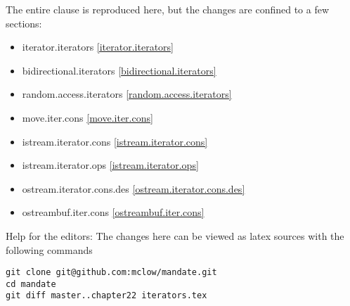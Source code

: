The entire clause is reproduced here, but the changes are confined to a few sections:

\begin{itemize}
\item{iterator.iterators        \ref{iterator.iterators}}
\item{bidirectional.iterators   \ref{bidirectional.iterators}}
\item{random.access.iterators   \ref{random.access.iterators}}
\item{move.iter.cons            \ref{move.iter.cons}}
\item{istream.iterator.cons     \ref{istream.iterator.cons}}
\item{istream.iterator.ops      \ref{istream.iterator.ops}}
\item{ostream.iterator.cons.des \ref{ostream.iterator.cons.des}}
\item{ostreambuf.iter.cons      \ref{ostreambuf.iter.cons}}
\end{itemize}

\vfill
Help for the editors: The changes here can be viewed as latex sources with the following commands
\begin{verbatim}
git clone git@github.com:mclow/mandate.git
cd mandate
git diff master..chapter22 iterators.tex
\end{verbatim}
\newpage
